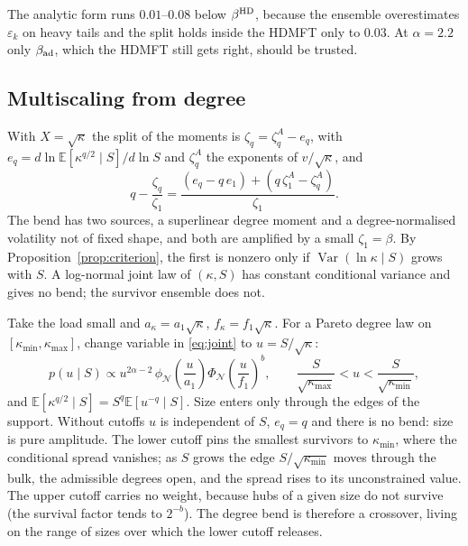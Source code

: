 \documentclass[11pt]{article}
\newcommand{\E}{\mathbb E}
\newcommand{\Var}{\operatorname{Var}}
\newcommand{\PhiN}{\Phi_{\mathcal N}}
\newcommand{\phiN}{\phi_{\mathcal N}}
\newcommand{\bad}{\beta_{\rm ad}}
\begin{document}
The analytic form runs $0.01$--$0.08$ below $\beta^{\rm HD}$, because the ensemble overestimates
$\varepsilon_k$ on heavy tails and the split holds inside the HDMFT only to $0.03$.  At $\alpha=2.2$
only $\bad$, which the HDMFT still gets right, should be trusted.

\subsection{Multiscaling from degree}

With $X=\sqrt\kappa$ the split of the moments is $\zeta_q=\zeta_q^A-e_q$, with
$e_q=d\ln\E[\kappa^{q/2}\mid S]/d\ln S$ and $\zeta_q^A$ the exponents of $v/\sqrt\kappa$, and
\begin{equation}
  q-\frac{\zeta_q}{\zeta_1}=\frac{(e_q-q\,e_1)+(q\,\zeta_1^A-\zeta_q^A)}{\zeta_1}.
  \label{eq:bend}
\end{equation}
The bend has two sources, a superlinear degree moment and a degree-normalised volatility not of
fixed shape, and both are amplified by a small $\zeta_1=\beta$.  By
Proposition~\ref{prop:criterion}, the first is nonzero only if $\Var(\ln\kappa\mid S)$ grows with
$S$.  A log-normal joint law of $(\kappa,S)$ has constant conditional variance and gives no bend;
the survivor ensemble does not.

Take the load small and $a_\kappa=a_1\sqrt\kappa$, $f_\kappa=f_1\sqrt\kappa$.  For a Pareto degree law on
$[\kappa_{\min},\kappa_{\max}]$, change variable in \eqref{eq:joint} to $u=S/\sqrt\kappa$:
\begin{equation}
  p(u\mid S)\propto u^{2\alpha-2}\,\phiN\!\left(\frac u{a_1}\right)\PhiN\!\left(\frac u{f_1}\right)^{b},
  \qquad\frac S{\sqrt{\kappa_{\max}}}<u<\frac S{\sqrt{\kappa_{\min}}} ,
\end{equation}
and $\E[\kappa^{q/2}\mid S]=S^q\E[u^{-q}\mid S]$.  Size enters only through the edges of the support.
Without cutoffs $u$ is independent of $S$, $e_q=q$ and there is no bend: size is pure amplitude.
The lower cutoff pins the smallest survivors to $\kappa_{\min}$, where the conditional spread
vanishes; as $S$ grows the edge $S/\sqrt{\kappa_{\min}}$ moves through the bulk, the admissible
degrees open, and the spread rises to its unconstrained value.  The upper cutoff carries no
weight, because hubs of a given size do not survive (the survival factor tends to $2^{-b}$).  The
degree bend is therefore a crossover, living on the range of sizes over which the lower cutoff
releases.
\end{document}
